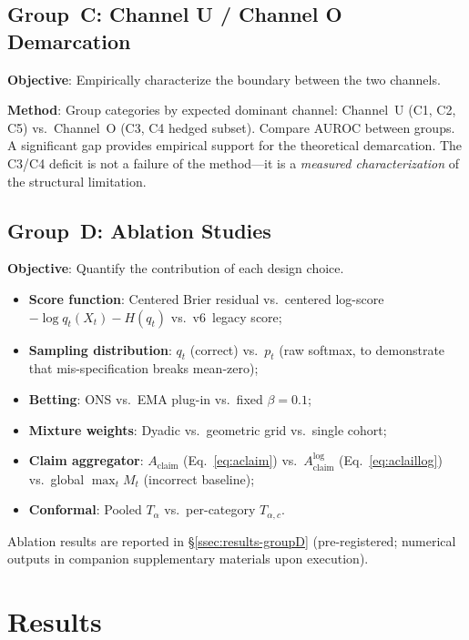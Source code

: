 \documentclass[runningheads]{llncs}
\newcommand{\claimscore}{A_{\text{claim}}}
\newcommand{\claimscorelog}{A_{\text{claim}}^{\log}}
\begin{document}
\subsection{Group~C: Channel U / Channel O Demarcation}

\textbf{Objective}: Empirically characterize the boundary between the two
channels.

\textbf{Method}: Group categories by expected dominant channel:
Channel~U (C1, C2, C5) vs.\ Channel~O (C3, C4 hedged subset).
Compare AUROC between groups. A significant gap provides empirical support for
the theoretical demarcation. The C3/C4 deficit is not a failure of the
method---it is a \textit{measured characterization} of the structural
limitation.

\subsection{Group~D: Ablation Studies}

\textbf{Objective}: Quantify the contribution of each design choice.
\begin{itemize}
    \item \textbf{Score function}: Centered Brier residual vs.\ centered
          log-score $-\log q_t(X_t) - H(q_t)$ vs.\ v6~legacy score;
    \item \textbf{Sampling distribution}: $q_t$ (correct) vs.\ $p_t$ (raw
          softmax, to demonstrate that mis-specification breaks mean-zero);
    \item \textbf{Betting}: ONS vs.\ EMA plug-in vs.\ fixed $\beta = 0.1$;
    \item \textbf{Mixture weights}: Dyadic vs.\ geometric grid vs.\ single cohort;
    \item \textbf{Claim aggregator}:
          $\claimscore$ (Eq.~\ref{eq:aclaim}) vs.\
          $\claimscorelog$ (Eq.~\ref{eq:aclaillog}) vs.\
          global $\max_t M_t$ (incorrect baseline);
    \item \textbf{Conformal}: Pooled $T_\alpha$ vs.\ per-category $T_{\alpha,c}$.
\end{itemize}

Ablation results are reported in \S\ref{ssec:results-groupD} (pre-registered;
numerical outputs in companion supplementary materials upon execution).

\section{Results}
\label{sec:results}
\end{document}
